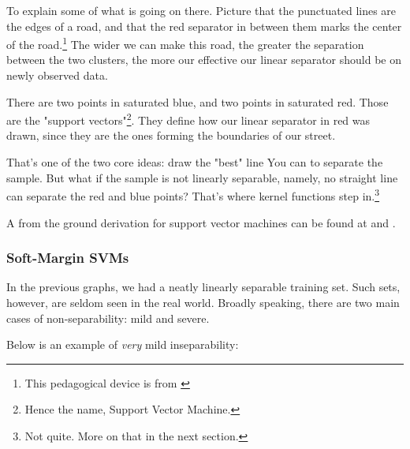 \documentclass[a4paper, 12pt]{article}
\begin{document}
                        \par To explain some of what is going on there. Picture that the punctuated lines are the edges of a road, and that the red separator in between them marks the center of the road.\footnote{This pedagogical device is from \cite{mitSupportVectorMachine}} The wider we can make this road, the greater the separation between the two clusters, the more our effective our linear separator should be on newly observed data.
                        
                        \par There are two points in saturated blue, and two points in saturated red. Those are the "support vectors"\footnote{Hence the name, Support Vector Machine.}. They define how our linear separator in red was drawn, since they are the ones forming the boundaries of our street. 
                        
                        \par That's one of the two core ideas: draw the "best" line You can to separate the sample. But what if the sample is not linearly separable, namely, no straight line can separate the red and blue points? That's where kernel functions step in.\footnote{Not quite. More on that in the next section.}
                        
                        \par A from the ground derivation for support vector machines can be found at \cite{mitSupportVectorMachine} and \cite{caltechSupportVectorMachine}.
                        
                    \newpage
                        
                    \subsubsection{Soft-Margin SVMs}
                    
                        \par In the previous graphs, we had a neatly linearly separable training set. Such sets, however, are seldom seen in the real world. Broadly speaking, there are two main cases of non-separability: mild and severe.
                        
                        \par Below is an example of \textit{very} mild inseparability:
                        
\end{document}
